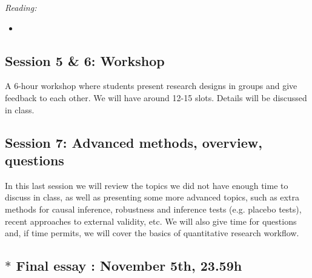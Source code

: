 \documentclass[12pt, a4paper]{article}
\begin{document}
\vspace{15pt}\noindent\textit{Reading:}

\begin{itemize}
  \item {\color{red}{TBD}}
\end{itemize}

\subsection*{Session 5 \& 6: Workshop}

A 6-hour workshop where students present research designs in groups and give feedback to each other. We will have around 12-15 slots. Details will be discussed in class.

\subsection*{Session 7: Advanced methods, overview, questions}

In this last session we will review the topics we did not have enough time to discuss in class, as well as presenting some more advanced topics, such as extra methods for causal inference, robustness and inference tests (e.g. placebo tests), recent approaches to external validity, etc. We will also give time for questions and, if time permits, we will cover the basics of quantitative research workflow.

\subsection*{$*$ Final essay {\color{red}{deadline}}: November 5th, 23.59h}
\end{document}
